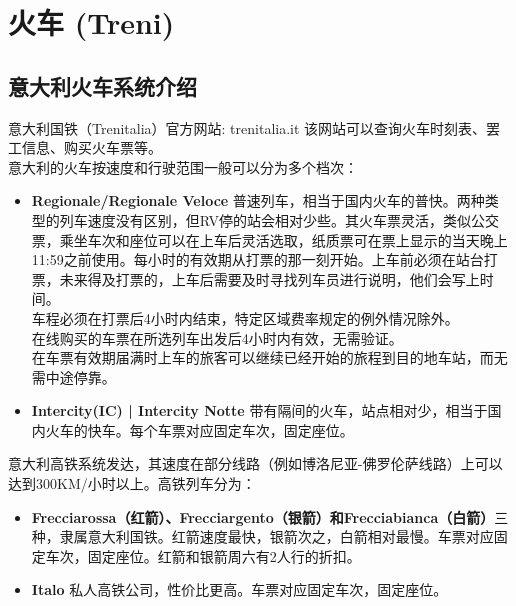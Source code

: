 \section{火车 (Treni)}

\subsection{意大利火车系统介绍}

意大利国铁（Trenitalia）官方网站: trenitalia.it 该网站可以查询火车时刻表、罢工信息、购买火车票等。\\
意大利的火车按速度和行驶范围一般可以分为多个档次：
\begin{itemize}
\item  \textbf{Regionale/Regionale Veloce} 普速列车，相当于国内火车的普快。两种类型的列车速度没有区别，但RV停的站会相对少些。其火车票灵活，类似公交票，乘坐车次和座位可以在上车后灵活选取，纸质票可在票上显示的当天晚上11:59之前使用。每小时的有效期从打票的那一刻开始。上车前必须在站台打票，未来得及打票的，上车后需要及时寻找列车员进行说明，他们会写上时间。\\
车程必须在打票后4小时内结束，特定区域费率规定的例外情况除外。\\
在线购买的车票在所选列车出发后4小时内有效，无需验证。\\
在车票有效期届满时上车的旅客可以继续已经开始的旅程到目的地车站，而无需中途停靠。
\item  \textbf{Intercity(IC) | Intercity Notte} 带有隔间的火车，站点相对少，相当于国内火车的快车。每个车票对应固定车次，固定座位。
\end{itemize}

意大利高铁系统发达，其速度在部分线路（例如博洛尼亚-佛罗伦萨线路）上可以达到300KM/小时以上。高铁列车分为：
\begin{itemize}
\item  \textbf{Frecciarossa（红箭）、Frecciargento（银箭）和Frecciabianca（白箭）}三种，隶属意大利国铁。红箭速度最快，银箭次之，白箭相对最慢。车票对应固定车次，固定座位。红箭和银箭周六有2人行的折扣。
\item  \textbf{Italo} 私人高铁公司，性价比更高。车票对应固定车次，固定座位。
\end{itemize}

